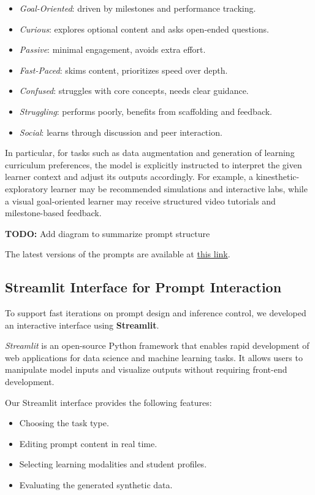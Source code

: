 \documentclass[sigconf]{acmart}
\begin{document}
{\small
\begin{itemize}
\item \textit{Goal-Oriented}: driven by milestones and performance tracking.
\item \textit{Curious}: explores optional content and asks open-ended questions.
\item \textit{Passive}: minimal engagement, avoids extra effort.
\item \textit{Fast-Paced}: skims content, prioritizes speed over depth.
\item \textit{Confused}: struggles with core concepts, needs clear guidance.
\item \textit{Struggling}: performs poorly, benefits from scaffolding and feedback.
\item \textit{Social}: learns through discussion and peer interaction.
\end{itemize}
}

In particular, for tasks such as data augmentation and generation of learning curriculum preferences, the model is explicitly instructed to interpret the given learner context and adjust its outputs accordingly. For example, a kinesthetic-exploratory learner may be recommended simulations and interactive labs, while a visual goal-oriented learner may receive structured video tutorials and milestone-based feedback.


\textbf{TODO:} Add diagram to summarize prompt structure

The latest versions of the prompts are available at \href{https://github.com/JCHAVEROT/semester-project/tree/main/experiments/SyntheticData/prompts}{this link}.

\subsection{Streamlit Interface for Prompt Interaction}

To support fast iterations on prompt design and inference control, we developed an interactive interface using \textbf{Streamlit}.

\textit{Streamlit} is an open-source Python framework that enables rapid development of web applications for data science and machine learning tasks. It allows users to manipulate model inputs and visualize outputs without requiring front-end development.

Our Streamlit interface provides the following features:
\begin{itemize}
	\item Choosing the task type.
	\item Editing prompt content in real time.
	\item Selecting learning modalities and student profiles.
	\item Evaluating the generated synthetic data.
\end{itemize}
\end{document}
